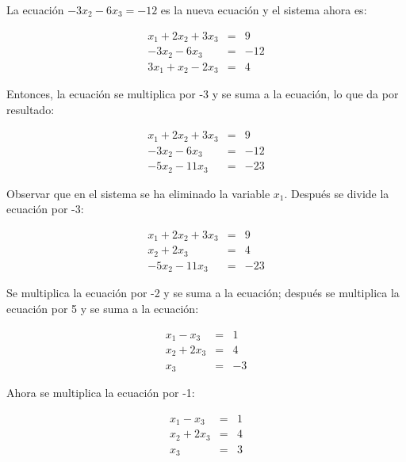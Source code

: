 \documentclass{plantillauft}
\begin{document}
La ecuación \(-3x_2 - 6x_3 = -12\) es la nueva ecuación y el sistema ahora es:

\begin{center}
\begin{eqnarray}
x_1 + 2x_2 + 3x_3 &=& 9 \nonumber \\
-3x_2 - 6x_3 &=& -12 \nonumber \\
3x_1 + x_2 - 2x_3 &=& 4 \nonumber
\end{eqnarray}
\end{center}

Entonces, la ecuación se multiplica por -3 y se suma a la ecuación, lo que da por resultado:

\begin{center}
\begin{eqnarray}
x_1 + 2x_2 + 3x_3 &=& 9 \nonumber \\
-3x_2 - 6x_3 &=& -12 \nonumber \\
-5x_2 - 11x_3 &=& -23 \nonumber
\end{eqnarray}
\end{center}

Observar que en el sistema se ha eliminado la variable \(x_1\). Después se divide la ecuación por -3:

\begin{center}
\begin{eqnarray}
x_1 + 2x_2 + 3x_3 &=& 9 \nonumber \\
x_2 + 2x_3 &=& 4 \nonumber \\
-5x_2 - 11x_3 &=& -23 \nonumber
\end{eqnarray}
\end{center}

Se multiplica la ecuación por -2 y se suma a la ecuación; después se multiplica la ecuación por 5 y se suma a la ecuación:

\begin{center}
\begin{eqnarray}
x_1 - x_3 &=& 1 \nonumber \\
x_2 + 2x_3 &=& 4 \nonumber \\
x_3 &=& -3 \nonumber
\end{eqnarray}
\end{center}

Ahora se multiplica la ecuación por -1:

\begin{center}
\begin{eqnarray}
x_1 - x_3 &=& 1 \nonumber \\
x_2 + 2x_3 &=& 4 \nonumber \\
x_3 &=& 3 \nonumber
\end{eqnarray}
\end{center}
\end{document}
